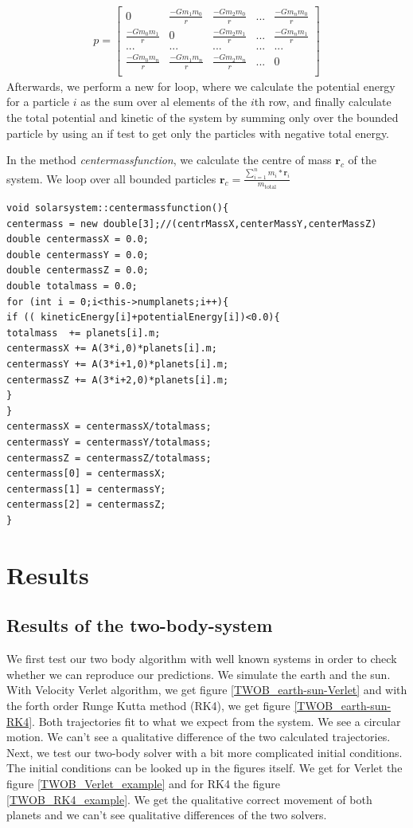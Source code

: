 \documentclass[10pt,a4paper]{article}
\begin{document}
\begin{align}
p=
\begin{bmatrix}
0 & \frac{-Gm_1m_0}{r} & \frac{-Gm_2m_0}{r} & ... & \frac{-Gm_nm_0}{r}  \\
\frac{-Gm_0m_1}{r} & 0 & \frac{-Gm_2m_1}{r} & ... & \frac{-Gm_nm_1}{r}  \\
... & ... & ... & ... & ... \\
\frac{-Gm_0m_n}{r} & \frac{-Gm_1m_n}{r} & \frac{-Gm_2m_n}{r} & ... & 0  \\
\end{bmatrix}
\end{align} 
Afterwards, we perform a new for loop, where we calculate the potential energy for a particle $i$ as the sum over al elements of the $i$th row, and finally calculate the total potential and kinetic of the system by summing only over the bounded particle by using an if test to get only the particles with negative total energy.

In the method \emph{centermassfunction}, we calculate the centre of mass $\mathbf{r}_c$ of the system. We loop over all bounded particles $\mathbf{r}_c = \frac{\sum\limits_{i=1}^n m_i*\mathbf{r}_i}{m_\mathrm{total}}$
\begin{lstlisting} 
void solarsystem::centermassfunction(){
centermass = new double[3];//(centrMassX,centerMassY,centerMassZ)
double centermassX = 0.0;
double centermassY = 0.0;
double centermassZ = 0.0;
double totalmass = 0.0;
for (int i = 0;i<this->numplanets;i++){
if (( kineticEnergy[i]+potentialEnergy[i])<0.0){
totalmass  += planets[i].m;
centermassX += A(3*i,0)*planets[i].m;
centermassY += A(3*i+1,0)*planets[i].m;
centermassZ += A(3*i+2,0)*planets[i].m;
}
}
centermassX = centermassX/totalmass;
centermassY = centermassY/totalmass;
centermassZ = centermassZ/totalmass;
centermass[0] = centermassX;
centermass[1] = centermassY;
centermass[2] = centermassZ;
}
\end{lstlisting}
\clearpage
\section{Results}

\subsection{Results of the two-body-system}

We first test our two body algorithm with well known systems in order to check whether we can reproduce our predictions. We simulate the earth and the sun. With Velocity Verlet algorithm, we get figure \ref{TWOB_earth-sun-Verlet} and with the forth order Runge Kutta method (RK4), we get figure \ref{TWOB_earth-sun-RK4}. Both trajectories fit to what we expect from the system. We see a circular motion. We can't see a qualitative difference of the two calculated trajectories. 
Next, we test our two-body solver with a bit more complicated initial conditions. The initial conditions can be looked up in the figures itself. We get for Verlet the figure \ref{TWOB_Verlet_example} and for RK4 the figure \ref{TWOB_RK4_example}. We get the qualitative correct movement of both planets and we can't see qualitative differences of the two solvers. 
\end{document}
